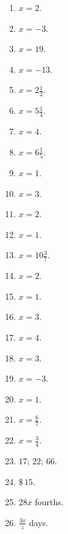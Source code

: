 \documentclass{book}
\begin{document}
\begin{enumerate}

\item $x = 2$.

\item $x = -3$.

\item $x = 19$.

\item $x = -13$.

\item $x = 2\frac{1}{2}$.

\item $x = 5\frac{1}{4}$.

\item $x = 4$.

\item $x = 6\frac{1}{5}$.

\item $x = 1$.

\item $x = 3$.

\item $x = 2$.

\item $x = 1$.

\item $x = 10\frac{3}{7}$.

\item $x = 2$.

\item $x = 1$.

\item $x = 3$.

\item $x = 4$.

\item $x = 3$.

\item $x = -3$.

\item $x = 1$.

\item $x =\frac{6}{7}$.

\item $x = \frac{3}{4}$.

\item $17$; $22$; $66$.

\item $\$\,15$.

\item $28x$ fourths.

\item $\displaystyle \frac{3x}{z}$ days.


\end{enumerate}
\end{document}
